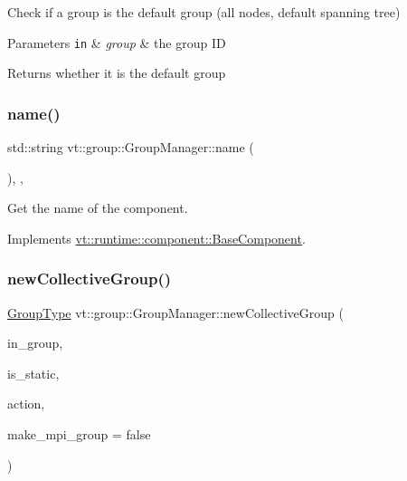 Check if a group is the default group (all nodes, default spanning tree) 


\begin{DoxyParams}[1]{Parameters}
\mbox{\tt in}  & {\em group} & the group ID\\
\hline
\end{DoxyParams}
\begin{DoxyReturn}{Returns}
whether it is the default group 
\end{DoxyReturn}
\mbox{\label{structvt_1_1group_1_1_group_manager_a46802e85936e68f9bebc844af1793da3}} 
\subsubsection{\texorpdfstring{name()}{name()}}
{\footnotesize\ttfamily std\+::string vt\+::group\+::\+Group\+Manager\+::name (\begin{DoxyParamCaption}{ }\end{DoxyParamCaption})\hspace{0.3cm}{\ttfamily [inline]}, {\ttfamily [override]}, {\ttfamily [virtual]}}



Get the name of the component. 



Implements \hyperlink{structvt_1_1runtime_1_1component_1_1_base_component_a7701485f3539f78d42e6bad47fc7eb78}{vt\+::runtime\+::component\+::\+Base\+Component}.

\mbox{\label{structvt_1_1group_1_1_group_manager_aeea7806669858363e19dfd221fee9cf5}} 
\subsubsection{\texorpdfstring{new\+Collective\+Group()}{newCollectiveGroup()}}
{\footnotesize\ttfamily \hyperlink{namespacevt_a27b5e4411c9b6140c49100e050e2f743}{Group\+Type} vt\+::group\+::\+Group\+Manager\+::new\+Collective\+Group (\begin{DoxyParamCaption}\item[{bool const}]{in\+\_\+group,  }\item[{bool const}]{is\+\_\+static,  }\item[{\hyperlink{structvt_1_1group_1_1_group_manager_ae871c5871ad62b530220009c1ee4d4b9}{Action\+Group\+Type}}]{action,  }\item[{bool}]{make\+\_\+mpi\+\_\+group = {\ttfamily false} }\end{DoxyParamCaption})\hspace{0.3cm}{\ttfamily [private]}}



